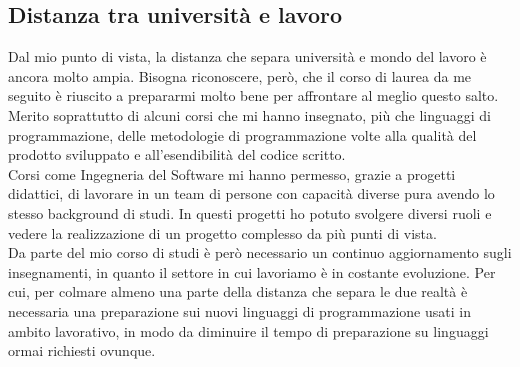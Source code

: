 \subsection{Distanza tra universit\`a e lavoro}
Dal mio punto di vista, la distanza che separa universit\`a e mondo del lavoro \`e ancora molto ampia.  Bisogna riconoscere, per\`o, che il corso di laurea da me seguito \`e riuscito a prepararmi molto bene per affrontare al meglio questo salto. Merito soprattutto di alcuni corsi che mi hanno insegnato, pi\`u che linguaggi di programmazione, delle metodologie di programmazione volte alla qualit\`a del prodotto sviluppato e all'esendibilit\`a del codice scritto.\\
Corsi come Ingegneria del Software mi hanno permesso, grazie a progetti didattici, di lavorare in un team di persone con capacit\`a diverse pura avendo lo stesso background di studi. In questi progetti ho potuto svolgere diversi ruoli e vedere la realizzazione di un progetto complesso da pi\`u punti di vista.\\
Da parte del mio corso di studi \`e per\`o necessario un continuo aggiornamento sugli insegnamenti, in quanto il settore in cui lavoriamo \`e in costante evoluzione. Per cui, per colmare almeno una parte della distanza che separa le due realt\`a \`e necessaria una preparazione sui nuovi linguaggi di programmazione usati in ambito lavorativo, in modo da diminuire il tempo di preparazione su linguaggi ormai richiesti ovunque.

